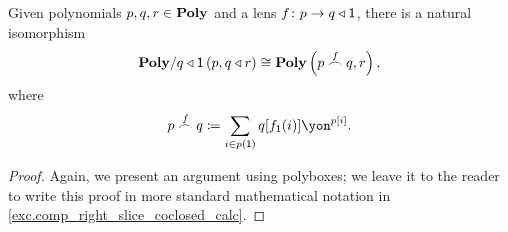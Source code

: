 \documentclass[Book-Poly]{subfiles}
\begin{document}
\begin{proposition} \label{prop.comp_right_slice_coclosed}
Given polynomials $p,q,r\in\mathbf{Poly}$ and a lens $f\colon p\to q\mathbin{\triangleleft}\textsf{1}$, there is a natural isomorphism
\begin{equation} \label{eqn.rchom_adj_iso}
    \mathbf{Poly}/q\mathbin{\triangleleft}\textsf{1}\left(p, q\mathbin{\triangleleft} r\right)\cong\mathbf{Poly}\left(p\overset{f}{\frown}q, r\right),
\end{equation}
where
\begin{equation} \label{eqn.rchom_def}
    p\rchom{f}q\coloneqq\sum_{i\in p(\1)}q[f_\1(i)]\yon^{p[i]}.
\end{equation}
\end{proposition}
\begin{proof}
Again, we present an argument using polyboxes; we leave it to the reader to write this proof in more standard mathematical notation in \cref{exc.comp_right_slice_coclosed_calc}.


\end{proof}
\end{document}
